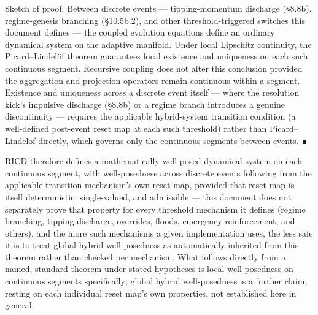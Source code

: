 \documentclass[
]{article}
\begin{document}
Sketch of proof. Between discrete events --- tipping-momentum discharge
(§8.8b), regime-genesis branching (§10.5b.2), and other
threshold-triggered switches this document defines --- the coupled
evolution equations define an ordinary dynamical system on the adaptive
manifold. Under local Lipschitz continuity, the Picard--Lindelöf theorem
guarantees local existence and uniqueness on each such continuous
segment. Recursive coupling does not alter this conclusion provided the
aggregation and projection operators remain continuous within a segment.
Existence and uniqueness across a discrete event itself --- where the
resolution kick's impulsive discharge (§8.8b) or a regime branch
introduces a genuine discontinuity --- requires the applicable
hybrid-system transition condition (a well-defined post-event reset map
at each such threshold) rather than Picard--Lindelöf directly, which
governs only the continuous segments between events. ∎

RICD therefore defines a mathematically well-posed dynamical system on
each continuous segment, with well-posedness across discrete events
following from the applicable transition mechanism's own reset map,
provided that reset map is itself deterministic, single-valued, and
admissible --- this document does not separately prove that property for
every threshold mechanism it defines (regime branching, tipping
discharge, overrides, floods, emergency reinforcement, and others), and
the more such mechanisms a given implementation uses, the less safe it
is to treat global hybrid well-posedness as automatically inherited from
this theorem rather than checked per mechanism. What follows directly
from a named, standard theorem under stated hypotheses is local
well-posedness on continuous segments specifically; global hybrid
well-posedness is a further claim, resting on each individual reset
map's own properties, not established here in general.
\end{document}
